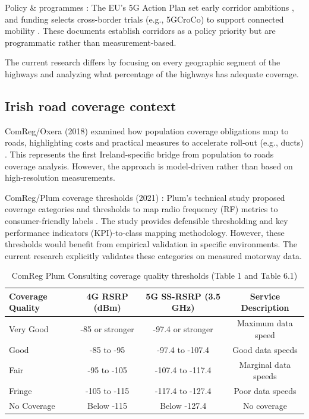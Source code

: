 \documentclass[MScCS]{uccthesis}
\begin{document}
Policy \& programmes : The EU's 5G Action Plan set early corridor ambitions \cite{eu2016_action_plan}, and funding selects cross-border trials (e.g., 5GCroCo) to support connected mobility \cite{5gcroc_project}. These documents establish corridors as a policy priority but are programmatic rather than measurement-based.

The current research differs by focusing on every geographic segment of the highways and analyzing what percentage of the highways has adequate coverage.

\subsection{Irish road coverage context}

ComReg/Oxera (2018) examined how population coverage obligations map to roads, highlighting costs and practical measures to accelerate roll-out (e.g., ducts) \cite{comreg2018improving}. This represents the first Ireland-specific bridge from population to roads coverage analysis. However, the approach is model-driven rather than based on high-resolution measurements.

ComReg/Plum coverage thresholds (2021) : Plum's technical study proposed coverage categories and thresholds to map radio frequency (RF) metrics to consumer-friendly labels \cite{comreg_plum_21118}. The study provides defensible thresholding and key performance indicators (KPI)-to-class mapping methodology. However, these thresholds would benefit from empirical validation in specific environments. The current research explicitly validates these categories on measured motorway data.

\begin{table}[h]
   \centering
   \begin{tabular}{|l|c|c|c|}
   \hline
   \textbf{Coverage Quality} & \textbf{4G RSRP (dBm)} & \textbf{5G SS-RSRP (3.5 GHz)} & \textbf{Service Description} \\
   \hline
   Very Good & -85 or stronger & -97.4 or stronger &  Maximum data speed \\
   \hline
   Good & -85 to -95 & -97.4 to -107.4 & Good data speeds \\
   \hline
   Fair & -95 to -105 & -107.4 to -117.4 &  Marginal data speeds  \\
   \hline
   Fringe & -105 to -115 & -117.4 to -127.4 & Poor data speeds \\
   \hline
   No Coverage & Below -115 & Below -127.4 &  No coverage  \\
   \hline
   \end{tabular}
   \caption{ComReg Plum Consulting coverage quality thresholds (Table 1 and Table 6.1)}
   \label{tab:plum_coverage_thresholds}
   \end{table}
\end{document}
